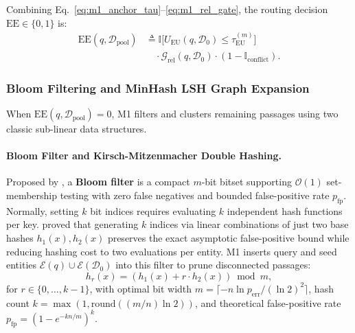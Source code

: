 \documentclass[11pt]{article}
\begin{document}
Combining Eq.~\eqref{eq:m1_anchor_tau}--\eqref{eq:m1_rel_gate}, the routing decision $\text{EE} \in \{0,1\}$ is:
\begin{align}
\text{EE}(q, \mathcal{D}_{\text{pool}}) &\triangleq \mathbb{I}\bigl[U_{\text{EU}}(q, \mathcal{D}_0) \le \tau_{\text{EU}}^{(m)}\bigr] \nonumber \\
&\quad \cdot \mathcal{G}_{\text{rel}}(q, \mathcal{D}_0) \cdot (1 - \mathbb{I}_{\text{conflict}}).
\label{eq:m1_ee}
\end{align}

\subsubsection{Bloom Filtering and MinHash LSH Graph Expansion}
When $\text{EE}(q, \mathcal{D}_{\text{pool}}) = 0$, M1 filters and clusters remaining passages using two classic sub-linear data structures.

\paragraph{Bloom Filter and Kirsch-Mitzenmacher Double Hashing.}
Proposed by \citet{bloom1970space}, a \textbf{Bloom filter} is a compact $m$-bit bitset supporting $\mathcal{O}(1)$ set-membership testing with zero false negatives and bounded false-positive rate $p_{\text{fp}}$. Normally, setting $k$ bit indices requires evaluating $k$ independent hash functions per key. \citet{kirsch2006less} proved that generating $k$ indices via linear combinations of just two base hashes $h_1(x), h_2(x)$ preserves the exact asymptotic false-positive bound while reducing hashing cost to two evaluations per entity. M1 inserts query and seed entities $\mathcal{E}(q) \cup \mathcal{E}(\mathcal{D}_0)$ into this filter to prune disconnected passages:
\begin{equation}
h_r(x) = \left( h_1(x) + r \cdot h_2(x) \right) \bmod m,
\label{eq:m1_bloom}
\end{equation}
for $r \in \{0, \dots, k-1\}$, with optimal bit width $m = \lceil -n \ln p_{\text{err}} / (\ln 2)^2 \rceil$, hash count $k = \max(1, \text{round}((m/n)\ln 2))$, and theoretical false-positive rate $p_{\text{fp}} = (1 - e^{-kn/m})^k$.
\end{document}
